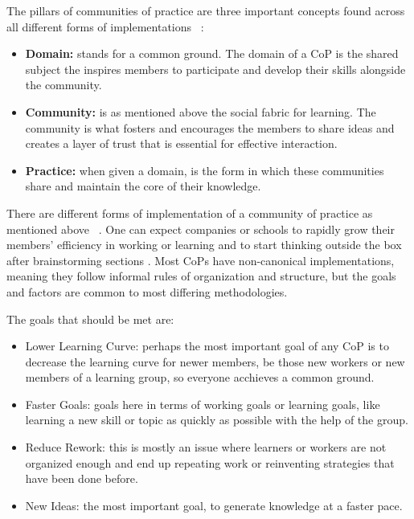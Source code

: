 The pillars of communities of practice are three important concepts found across all
different forms of implementations ~\cite{placeofcopinkm}:

\begin{itemize}
    \item \textbf{Domain:} stands for a common ground. The domain of a CoP is the 
        shared subject the inspires members to participate and develop their skills
        alongside the community.
    \item \textbf{Community:} is as mentioned above the social fabric for learning.
        The community is what fosters and encourages the members to share ideas 
        and creates a layer of trust that is essential for effective interaction.
    \item \textbf{Practice:} when given a domain, is the form in which these 
        communities share and maintain the core of their knowledge.
\end{itemize}

There are different forms of implementation of a community of practice as mentioned
above ~\cite{buildingcopthatwork}.
One can expect companies or schools to rapidly grow their members' 
efficiency in working or learning and to start thinking outside the box after 
brainstorming sections \cite{thinkingtogether}.
Most CoPs have non-canonical implementations, meaning they follow informal rules 
of organization and structure, but the goals and factors are common to most 
differing methodologies.

The goals that should be met are:
\begin{itemize}
    \item Lower Learning Curve: perhaps the most important goal of any CoP is to
        decrease the learning curve for newer members, be those new workers or 
        new members of a learning group, so everyone acchieves a common ground.
    \item Faster Goals: goals here in terms of working goals or learning goals, 
        like learning a new skill or topic as quickly as possible with the help 
        of the group.
    \item Reduce Rework: this is mostly an issue where learners or workers are not
        organized enough and end up repeating work or reinventing strategies that
        have been done before.
    \item New Ideas: the most important goal, to generate knowledge at a faster pace.
\end{itemize}


